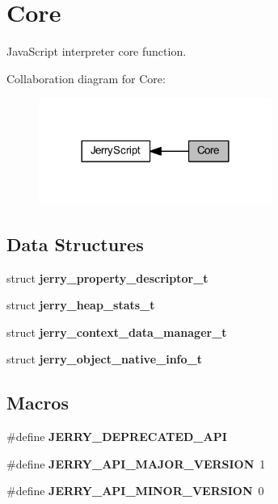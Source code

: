 \section{Core}
\label{group___core}


Java\+Script interpreter core function.  


Collaboration diagram for Core\+:\nopagebreak
\begin{figure}[H]
\begin{center}
\leavevmode
\includegraphics[width=216pt]{group___core}
\end{center}
\end{figure}
\subsection*{Data Structures}
\begin{DoxyCompactItemize}
\item 
struct \textbf{ jerry\+\_\+property\+\_\+descriptor\+\_\+t}
\item 
struct \textbf{ jerry\+\_\+heap\+\_\+stats\+\_\+t}
\item 
struct \textbf{ jerry\+\_\+context\+\_\+data\+\_\+manager\+\_\+t}
\item 
struct \textbf{ jerry\+\_\+object\+\_\+native\+\_\+info\+\_\+t}
\end{DoxyCompactItemize}
\subsection*{Macros}
\begin{DoxyCompactItemize}
\item 
\#define \textbf{ J\+E\+R\+R\+Y\+\_\+\+D\+E\+P\+R\+E\+C\+A\+T\+E\+D\+\_\+\+A\+PI}
\item 
\#define \textbf{ J\+E\+R\+R\+Y\+\_\+\+A\+P\+I\+\_\+\+M\+A\+J\+O\+R\+\_\+\+V\+E\+R\+S\+I\+ON}~1
\item 
\#define \textbf{ J\+E\+R\+R\+Y\+\_\+\+A\+P\+I\+\_\+\+M\+I\+N\+O\+R\+\_\+\+V\+E\+R\+S\+I\+ON}~0
\end{DoxyCompactItemize}
